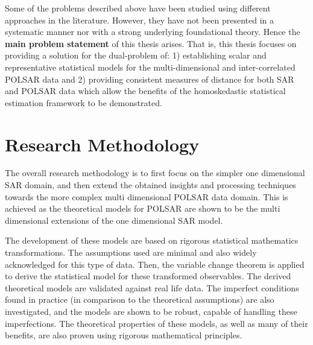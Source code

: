 Some of the problems described above have been studied using different approaches in the literature.
However, they have not been presented in a systematic manner nor with a strong underlying foundational theory.
Hence the \textbf{main problem statement} of this thesis arises. %
That is,
                this thesis focuses on providing a solution for the
                dual-problem of: 1) establishing scalar and
                representative statistical models for the
                multi-dimensional and inter-correlated POLSAR data and
                2) providing consistent measures of distance for both
                SAR and POLSAR data which allow the benefits of the
                homoskedastic statistical estimation framework to be
                demonstrated.

\section{Research Methodology}
The
                overall research methodology is to first focus on the
                simpler one dimensional SAR domain, and then extend the
                obtained insights and processing techniques 
towards the more complex multi dimensional
                POLSAR data domain.
This
                is achieved as the theoretical models for
                POLSAR are shown to be the multi dimensional extensions of
                the one dimensional SAR model.

The
                development of these models are based on
                rigorous statistical mathematics transformations. %
The
                assumptions used are minimal and also widely
                acknowledged for this type of data.
Then, the variable change theorem is applied to derive the statistical model for these transformed observables. %
The
                derived theoretical models are validated against
                real life data.
The
                imperfect conditions found in practice (in
                comparison to the theoretical assumptions) are also
                investigated, and the models are shown to be robust, capable of
                handling these imperfections.
The
                theoretical properties of these models, as well as many
                of their benefits, are also proven using rigorous
                mathematical principles.

